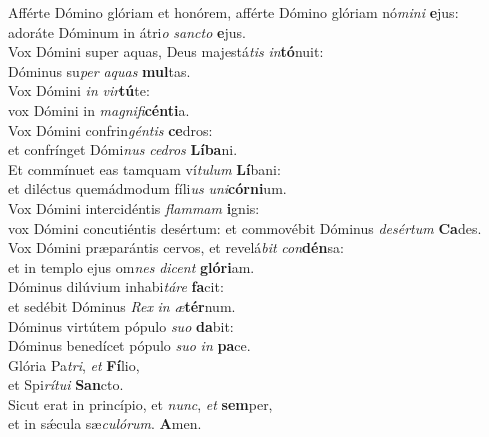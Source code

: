 \evenverse Afférte Dómino glóriam et honórem, afférte Dómino glóriam nó\textit{mi}\textit{ni} \textbf{e}jus:~\*\\
\evenverse adoráte Dóminum in átri\textit{o} \textit{san}\textit{cto} \textbf{e}jus.\\
\oddverse Vox Dómini super aquas, Deus majestá\textit{tis} \textit{in}\textbf{tó}nuit:~\*\\
\oddverse Dóminus su\textit{per} \textit{a}\textit{quas} \textbf{mul}tas.\\
\evenverse Vox Dómini \textit{in} \textit{vir}\textbf{tú}te:~\*\\
\evenverse vox Dómini in \textit{ma}\textit{gni}\textit{fi}\textbf{cén}\textbf{ti}a.\\
\oddverse Vox Dómini confrin\textit{gén}\textit{tis} \textbf{ce}dros:~\*\\
\oddverse et confrínget Dómi\textit{nus} \textit{ce}\textit{dros} \textbf{Lí}\textbf{ba}ni.\\
\evenverse Et commínuet eas tamquam ví\textit{tu}\textit{lum} \textbf{Lí}bani:~\*\\
\evenverse et diléctus quemádmodum fíli\textit{us} \textit{u}\textit{ni}\textbf{cór}\textbf{ni}um.\\
\oddverse Vox Dómini intercidéntis \textit{flam}\textit{mam} \textbf{i}gnis:~\*\\
\oddverse vox Dómini concutiéntis desértum: et commovébit Dóminus \textit{de}\textit{sér}\textit{tum} \textbf{Ca}des.\\
\evenverse Vox Dómini præparántis cervos, et revelá\textit{bit} \textit{con}\textbf{dén}sa:~\*\\
\evenverse et in templo ejus om\textit{nes} \textit{di}\textit{cent} \textbf{gló}\textbf{ri}am.\\
\oddverse Dóminus dilúvium inhabi\textit{tá}\textit{re} \textbf{fa}cit:~\*\\
\oddverse et sedébit Dóminus \textit{Rex} \textit{in} \textit{æ}\textbf{tér}num.\\
\evenverse Dóminus virtútem pópulo \textit{su}\textit{o} \textbf{da}bit:~\*\\
\evenverse Dóminus benedícet pópulo \textit{su}\textit{o} \textit{in} \textbf{pa}ce.\\
\oddverse Glória Pa\textit{tri}, \textit{et} \textbf{Fí}lio,~\*\\
\oddverse et Spi\textit{rí}\textit{tu}\textit{i} \textbf{San}cto.\\
\evenverse Sicut erat in princípio, et \textit{nunc}, \textit{et} \textbf{sem}per,~\*\\
\evenverse et in sǽcula sæ\textit{cu}\textit{ló}\textit{rum}. \textbf{A}men.\\
